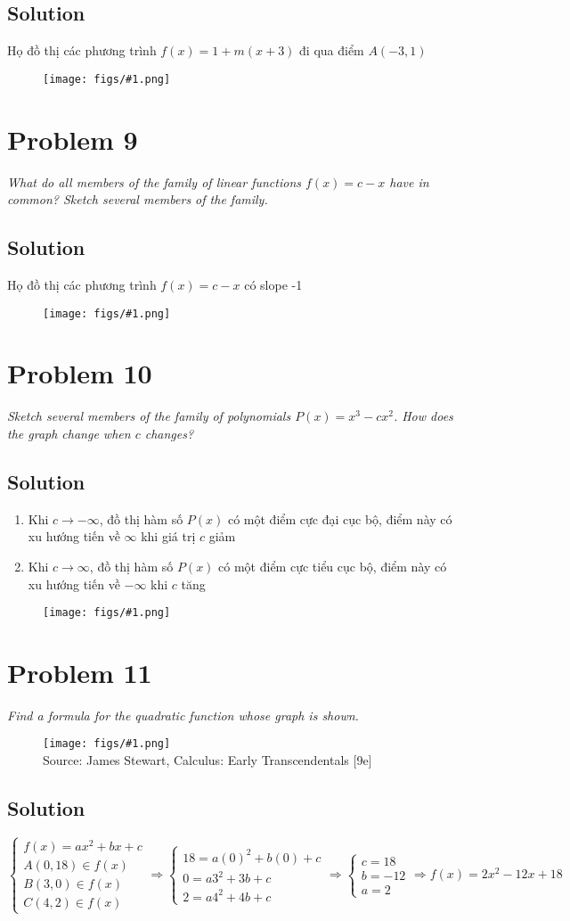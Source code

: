\documentclass[11pt]{article}
\newcommand{\soln}{\subsection*}
\newcommand{\qn}{\textit}
\newcommand{\imagesource}[1]{{\footnotesize Source: #1}}
\newcommand{\imgqn}[1]{
	\begin{figure}[H]
		\centering
		\texttt{[image: figs/\#1.png]}\\
		\imagesource{James Stewart, Calculus: Early Transcendentals [9e]}
	\end{figure}
}
\newcommand{\imgsoln}[1]{
	\begin{figure}[H]
		\centering
		\texttt{[image: figs/\#1.png]}
	\end{figure}
}
\begin{document}
\soln{Solution}
Họ đồ thị các phương trình $f(x)=1+m(x+3)$ đi qua điểm $A(-3, 1)$
\imgsoln{1.2.8-ans}

\section*{Problem 9}

\qn{What do all members of the family of linear functions $f(x)=c-x$ have in common? Sketch several members of the family.}

\soln{Solution}
Họ đồ thị các phương trình $f(x)=c-x$ có slope -1
\imgsoln{1.2.9-ans}

\section*{Problem 10}

\qn{Sketch several members of the family of polynomials $P(x)=x^3-cx^2$. How does the graph change when $c$ changes?}

\soln{Solution}
\begin{enumerate}
	\item Khi $c \to -\infty$, đồ thị hàm số $P(x)$ có một điểm cực đại cục bộ, điểm này có xu hướng tiến về $\infty$ khi giá trị $c$ giảm
	\item Khi $c \to \infty$, đồ thị hàm số $P(x)$ có một điểm cực tiểu cục bộ, điểm này có xu hướng tiến về $-\infty$ khi $c$ tăng
\end{enumerate}
\imgsoln{1.2.10-ans}

\section*{Problem 11}

\qn{Find a formula for the quadratic function whose graph is shown.}

\imgqn{1.2.11}

\soln{Solution}
\begin{equation*}
	\begin{cases}
		f(x)=ax^2+bx+c \\
		A(0,18) \in f(x) \\
		B(3,0) \in f(x) \\
		C(4,2) \in f(x)
	\end{cases}
	\Rightarrow
	\begin{cases}
		18=a(0)^2+b(0)+c \\
		0=a3^2+3b+c \\
		2=a4^2+4b+c
	\end{cases}
	\Rightarrow
	\begin{cases}
		c=18 \\
		b=-12 \\
		a=2
	\end{cases}
	\Rightarrow
	f(x)=2x^2-12x+18
\end{equation*}
\end{document}
